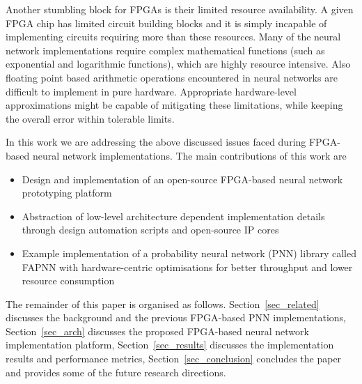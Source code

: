 Another stumbling block for FPGAs is their limited resource availability.
A given FPGA chip has limited circuit building blocks and it is simply incapable of implementing circuits requiring more than these resources.
Many of the neural network implementations require complex mathematical functions (such as exponential and logarithmic functions), which are highly resource intensive.
Also floating point based arithmetic operations encountered in neural networks are difficult to implement in pure hardware.
Appropriate hardware-level approximations might be capable of mitigating these limitations, while keeping the overall error within tolerable limits. 

In this work we are addressing the above discussed issues faced during FPGA-based neural network implementations.
The main contributions of this work are
\begin{itemize}
\item Design and implementation of an open-source FPGA-based neural network prototyping platform
\item Abstraction of low-level architecture dependent implementation details through design automation scripts and open-source IP cores
\item Example implementation of a probability neural network (PNN) library called FAPNN with hardware-centric optimisations for better throughput and lower resource consumption
\end{itemize}

The remainder of this paper is organised as follows.
Section~\ref{sec_related} discusses the background and the previous FPGA-based PNN implementations, Section~\ref{sec_arch} discusses the proposed FPGA-based neural network implementation platform, Section~\ref{sec_results} discusses the implementation results and performance metrics, Section~\ref{sec_conclusion} concludes the paper and provides some of the future research directions.